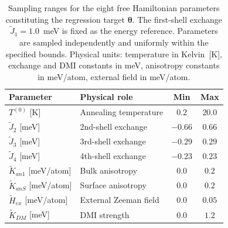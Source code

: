\documentclass[final,5p,times,twocolumn]{elsarticle}
\begin{document}
\begin{table}[h]
\centering
\caption{Sampling ranges for the eight free Hamiltonian 
parameters constituting the regression target 
$\boldsymbol{\theta}$. The first-shell exchange 
$\tilde{J}_1 = 1.0$~meV is fixed as the energy 
reference. Parameters are sampled independently and 
uniformly within the specified bounds. Physical units: 
temperature in Kelvin~[K], exchange and DMI constants 
in meV, anisotropy constants in meV/atom, external 
field in meV/atom.}
\label{tab:param_ranges}
\begin{tabular}{llcc}
\hline
\textbf{Parameter} & \textbf{Physical role} & 
\textbf{Min} & \textbf{Max} \\
\hline
$T^{(0)}$ [K]                & Annealing temperature  & $0.2$  & $20.0$ \\
$\tilde{J}_2$ [meV]          & 2nd-shell exchange     & $-0.66$ & $0.66$  \\
$\tilde{J}_3$ [meV]          & 3rd-shell exchange     & $-0.29$ & $0.29$  \\
$\tilde{J}_4$ [meV]          & 4th-shell exchange     & $-0.23$ & $0.23$  \\
$\tilde{K}_{an1}$ [meV/atom] & Bulk anisotropy        & $0.0$  & $0.2$  \\
$\tilde{K}_{anS}$ [meV/atom] & Surface anisotropy     & $0.0$  & $0.2$  \\
$\tilde{H}_{ex}$ [meV/atom]  & External Zeeman field  & $0.0$  & $0.05$  \\
$\tilde{K}_{DM}$ [meV]       & DMI strength           & $0.0$  & $1.2$  \\
\hline
\end{tabular}
\end{table}
\end{document}
